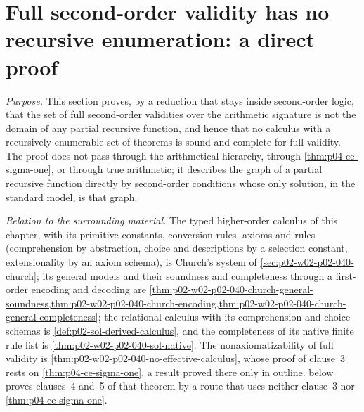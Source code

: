 \section{Full second-order validity has no recursive enumeration: a direct proof}
\label{sec:p02-w02-p02-041-direct}

\emph{Purpose.}  This section proves, by a reduction that stays inside
second-order logic, that the set of full second-order validities over the
arithmetic signature is not the domain of any partial recursive function,
and hence that no calculus with a recursively enumerable set of theorems is
sound and complete for full validity.  The proof does not pass through the
arithmetical hierarchy, through \cref{thm:p04-ce-sigma-one}, or through
true arithmetic; it describes the graph of a partial recursive function
directly by second-order conditions whose only solution, in the standard
model, is that graph.

\emph{Relation to the surrounding material.}  The typed higher-order calculus
of this chapter, with its primitive constants, conversion rules, axioms and
rules (comprehension by abstraction, choice and descriptions by a selection
constant, extensionality by an axiom schema), is Church's system of
\cref{sec:p02-w02-p02-040-church}; its general models and their soundness and
completeness through a first-order encoding and decoding are
\cref{thm:p02-w02-p02-040-church-general-soundness,thm:p02-w02-p02-040-church-encoding,thm:p02-w02-p02-040-church-general-completeness};
the relational calculus with its comprehension and choice schemas is
\cref{def:p02-sol-derived-calculus}, and the completeness of its native finite
rule list is \cref{thm:p02-w02-p02-040-sol-native}.  The nonaxiomatizability
of full validity is \cref{thm:p02-w02-p02-040-no-effective-calculus}, whose
proof of clause~3 rests on \cref{thm:p04-ce-sigma-one}, a result proved there
only in outline.   below
proves clauses~4 and~5 of that theorem by a route that uses neither clause~3
nor \cref{thm:p04-ce-sigma-one}.

